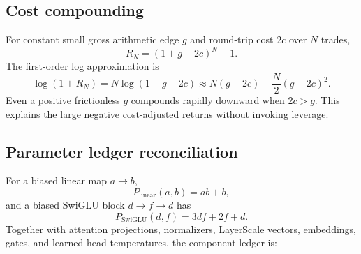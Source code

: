 \documentclass[10pt,letterpaper]{article}
\numberwithin{equation}{section}
\theoremstyle{definition}
\theoremstyle{remark}
\begin{document}
\subsection{Cost compounding}

For constant small gross arithmetic edge \(g\) and round-trip cost \(2c\) over
\(N\) trades,
\begin{equation}
R_N=(1+g-2c)^N-1.
\label{eq:cost-compounding}
\end{equation}
The first-order log approximation is
\begin{equation}
\log(1+R_N)
=N\log(1+g-2c)\approx N(g-2c)
-\frac{N}{2}(g-2c)^2.
\label{eq:log-cost}
\end{equation}
Even a positive frictionless \(g\) compounds rapidly downward when \(2c>g\).
This explains the large negative cost-adjusted returns without invoking
leverage.

\subsection{Parameter ledger reconciliation}

For a biased linear map \(a\rightarrow b\),
\begin{equation}
P_{\mathrm{linear}}(a,b)=ab+b,
\label{eq:linear-params}
\end{equation}
and a biased SwiGLU block \(d\rightarrow f\rightarrow d\) has
\begin{equation}
P_{\mathrm{SwiGLU}}(d,f)=3df+2f+d.
\label{eq:swiglu-params}
\end{equation}
Together with attention projections, normalizers, LayerScale vectors,
embeddings, gates, and learned head temperatures, the component ledger is:
\end{document}
